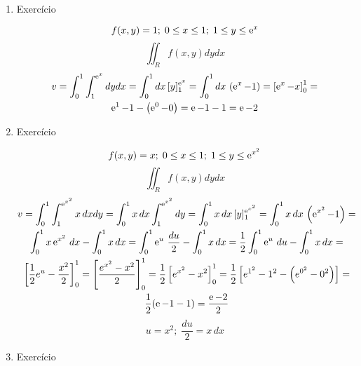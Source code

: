 \begin{enumerate}
	\item Exercício
	
	\begin{equation*}
		f(x,y) = 1;\; 0 \leq x \leq 1;\; 1 \leq y \leq \operatorname{e}^x	
	\end{equation*}
	\begin{equation*}
		\iint_R f(x, y) dy dx
	\end{equation*}
	\begin{gather*}
		v = \int_0^1 \int_1^{\operatorname{e}^x} dy dx = \int_0^1 dx\, [y]_1^{\operatorname{e}^x} = \int_0^1 dx\, \left(\operatorname{e}^x - 1\right) = \left[\operatorname{e}^x - x\right]_0^1 =\\ \operatorname{e}^1 - 1 - \left(\operatorname{e}^0 - 0\right) = \operatorname{e} - 1 - 1 = \operatorname{e} - 2	
	\end{gather*}
	
	\item Exercício
	
	\begin{equation*}
		f(x,y) = x;\; 0 \leq x \leq 1;\; 1 \leq y \leq \operatorname{e}^{x^2}
	\end{equation*}
	\begin{equation*}
		\iint_R f(x, y) dy dx
	\end{equation*}
	\begin{gather*}
		v = \int_0^1 \int_1^{\operatorname{e}^{x^2}} x\, dx dy = \int_0^1 x\,	dx \int_1^{\operatorname{e}^{x^2}} dy = \int_0^1 x\, dx\, [y]_1^{\operatorname{e}^{x^2}} = \int_0^1 x\, dx\, \left(\operatorname{e}^{x^2} - 1\right) =\\ \int_0^1 x\operatorname{e}^{x^2}\, dx - \int_0^1 x\,	dx = \int_0^1 \operatorname{e}^u\, \dfrac{du}{2} - \int_0^1 x\,	dx = \dfrac{1}{2}\int_0^1 \operatorname{e}^u\, du - \int_0^1 x\, dx =\\ \left[\dfrac{1}{2}e^u - \dfrac{x^2}{2}\right]_0^1 = \left[\dfrac{e^{x^2} - x^2}{2}\right]_0^1 = \dfrac{1}{2} \left[e^{x^2} - x^2\right]_0^1 = \dfrac{1}{2} \left[e^{1^2} - 1^2 - \left(e^{0^2} - 0^2\right)\right] =\\ \dfrac{1}{2}(\operatorname{e} - 1 - 1) = \dfrac{\operatorname{e} - 2}{2}
	\end{gather*}	
	\begin{equation*}
		u = x^2 ;\; \dfrac{du}{2} = x\, dx
	\end{equation*}
	
	\item Exercício
	

\end{enumerate}
